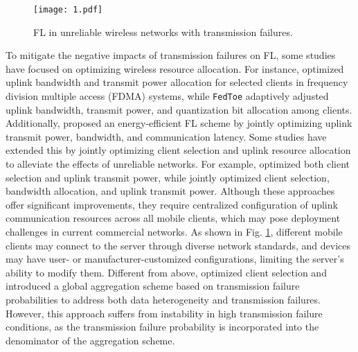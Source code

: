 \begin{figure}[t]
\centering
\texttt{[image: 1.pdf]}
\caption{FL in unreliable wireless networks with transmission failures.}
\label{fig:FL wireless networks}
\end{figure}


To mitigate the negative impacts of transmission failures on FL, some studies have focused on optimizing wireless resource allocation.
For instance,
\cite{chen2021joint} optimized uplink bandwidth and transmit power allocation for selected clients in frequency division multiple access (FDMA) systems, while \texttt{FedToe} \cite{wang2022quantized} adaptively adjusted uplink bandwidth, transmit power, and quantization bit allocation among clients.
Additionally, \cite{mahmoud2023federated} proposed an energy-efficient FL scheme by jointly optimizing uplink transmit power, bandwidth, and communication latency.
Some studies have extended this by jointly optimizing client selection and uplink resource allocation to alleviate the effects of unreliable networks.
For example,
\cite{zheng2023federated} optimized both client selection and uplink transmit power,
while \cite{chen2024robust} jointly optimized client selection, bandwidth allocation, and uplink transmit power.
Although these approaches offer significant improvements, they require centralized configuration of uplink communication resources across all mobile clients, which may pose deployment challenges in current commercial networks.
As shown in Fig. \ref{fig:FL wireless networks}, different mobile clients may connect to the server through diverse network standards, and devices may have user- or manufacturer-customized configurations, limiting the server's ability to modify them.
Different from above, \cite{salehi2021federated} optimized client selection and introduced a global aggregation scheme based on transmission failure probabilities to address both data heterogeneity and transmission failures.
However, this approach suffers from instability in high transmission failure conditions, as the transmission failure probability is incorporated into the denominator of the aggregation scheme.